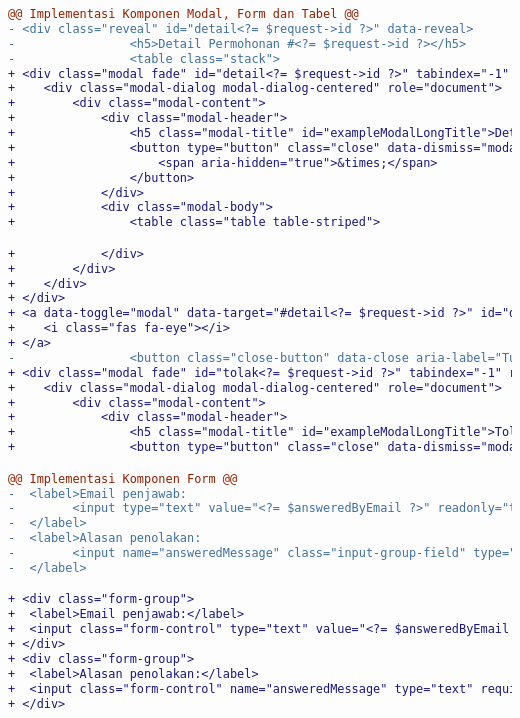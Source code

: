 \begin{lstlisting}[language=diff, caption=Kode untuk Modal Cetak Transkrip Manage, label=Entri, basicstyle=\ttfamily, frame=single,
columns=fullflexible, keepspaces=true, breaklines=true]
@@ Implementasi Komponen Modal, Form dan Tabel @@ 
- <div class="reveal" id="detail<?= $request->id ?>" data-reveal>
-                <h5>Detail Permohonan #<?= $request->id ?></h5>
-                <table class="stack">
+ <div class="modal fade" id="detail<?= $request->id ?>" tabindex="-1" role="dialog" aria-hidden="true">
+    <div class="modal-dialog modal-dialog-centered" role="document">
+        <div class="modal-content">
+            <div class="modal-header">
+                <h5 class="modal-title" id="exampleModalLongTitle">Detail Permohonan #<?= $request->id ?></h5>
+                <button type="button" class="close" data-dismiss="modal" aria-label="Close">
+                    <span aria-hidden="true">&times;</span>
+                </button>
+            </div>
+            <div class="modal-body">
+                <table class="table table-striped">

+            </div>
+        </div>
+    </div>
+ </div>
+ <a data-toggle="modal" data-target="#detail<?= $request->id ?>" id="detailIkon<?= $request->id ?>">
+    <i class="fas fa-eye"></i>
+ </a>
-                <button class="close-button" data-close aria-label="Tutup" type="button">
+ <div class="modal fade" id="tolak<?= $request->id ?>" tabindex="-1" role="dialog" aria-hidden="true">
+    <div class="modal-dialog modal-dialog-centered" role="document">
+        <div class="modal-content">
+            <div class="modal-header">
+                <h5 class="modal-title" id="exampleModalLongTitle">Tolak Permohonan #<?= $request->id ?></h5>
+                <button type="button" class="close" data-dismiss="modal" aria-label="Close">

@@ Implementasi Komponen Form @@
-  <label>Email penjawab:
-        <input type="text" value="<?= $answeredByEmail ?>" readonly="true"/>
-  </label>
-  <label>Alasan penolakan:
-        <input name="answeredMessage" class="input-group-field" type="text" required/>
-  </label>

+ <div class="form-group">
+  <label>Email penjawab:</label>
+  <input class="form-control" type="text" value="<?= $answeredByEmail ?>" readonly="true"/>
+ </div>
+ <div class="form-group">
+  <label>Alasan penolakan:</label>
+  <input class="form-control" name="answeredMessage" type="text" required/>
+ </div>


\end{lstlisting}
